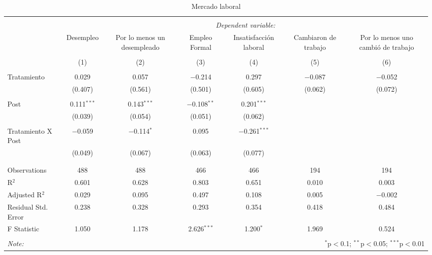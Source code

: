 
\begin{table}[H] \centering 
  \caption{Mercado laboral} 
  \label{reg_laboral} 
\tiny 
\begin{tabular}{@{\extracolsep{-7pt}}lcccccc} 
\\[-1.8ex]\hline 
\hline \\[-1.8ex] 
 & \multicolumn{6}{c}{\textit{Dependent variable:}} \\ 
\cline{2-7} 
 & Desempleo & Por lo menos un desempleado & Empleo Formal & Insatisfacción laboral & Cambiaron de trabajo & Por lo menos uno cambió de trabajo \\ 
\\[-1.8ex] & (1) & (2) & (3) & (4) & (5) & (6)\\ 
\hline \\[-1.8ex] 
 Tratamiento & 0.029 & 0.057 & $-$0.214 & 0.297 & $-$0.087 & $-$0.052 \\ 
  & (0.407) & (0.561) & (0.501) & (0.605) & (0.062) & (0.072) \\ 
  & & & & & & \\ 
 Post & 0.111$^{***}$ & 0.143$^{***}$ & $-$0.108$^{**}$ & 0.201$^{***}$ &  &  \\ 
  & (0.039) & (0.054) & (0.051) & (0.062) &  &  \\ 
  & & & & & & \\ 
 Tratamiento X Post & $-$0.059 & $-$0.114$^{*}$ & 0.095 & $-$0.261$^{***}$ &  &  \\ 
  & (0.049) & (0.067) & (0.063) & (0.077) &  &  \\ 
  & & & & & & \\ 
\hline \\[-1.8ex] 
Observations & 488 & 488 & 466 & 466 & 194 & 194 \\ 
R$^{2}$ & 0.601 & 0.628 & 0.803 & 0.651 & 0.010 & 0.003 \\ 
Adjusted R$^{2}$ & 0.029 & 0.095 & 0.497 & 0.108 & 0.005 & $-$0.002 \\ 
Residual Std. Error & 0.238 & 0.328 & 0.293 & 0.354 & 0.418 & 0.484 \\ 
F Statistic & 1.050 & 1.178 & 2.626$^{***}$ & 1.200$^{*}$ & 1.969 & 0.524 \\ 
\hline 
\hline \\[-1.8ex] 
\textit{Note:}  & \multicolumn{6}{r}{$^{*}$p$<$0.1; $^{**}$p$<$0.05; $^{***}$p$<$0.01} \\ 
\end{tabular} 
\end{table} 
